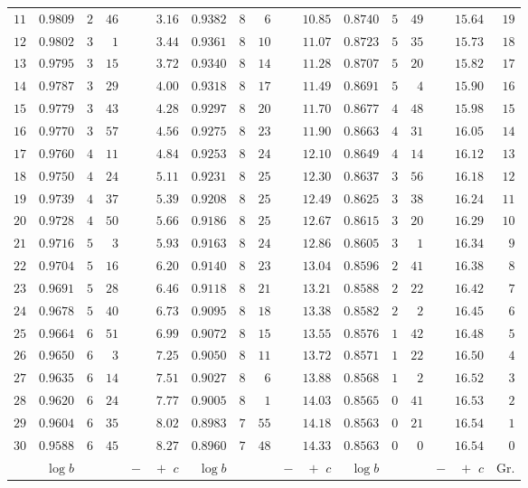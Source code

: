 \begin{center}
\begin{tabular}{r||r|rr|r||r|rr|r||r|rr|r||r}
$11$&$0.9809$&$2$&$46$&$3.16$&$0.9382$&$8$&$6$&$10.85$&$0.8740$&$5$&$49$&$15.64$&$19$\\
$12$&$0.9802$&$3$&$1$&$3.44$&$0.9361$&$8$&$10$&$11.07$&$0.8723$&$5$&$35$&$15.73$&$18$\\
$13$&$0.9795$&$3$&$15$&$3.72$&$0.9340$&$8$&$14$&$11.28$&$0.8707$&$5$&$20$&$15.82$&$17$\\
$14$&$0.9787$&$3$&$29$&$4.00$&$0.9318$&$8$&$17$&$11.49$&$0.8691$&$5$&$4$&$15.90$&$16$\\
$15$&$0.9779$&$3$&$43$&$4.28$&$0.9297$&$8$&$20$&$11.70$&$0.8677$&$4$&$48$&$15.98$&$15$\\
$16$&$0.9770$&$3$&$57$&$4.56$&$0.9275$&$8$&$23$&$11.90$&$0.8663$&$4$&$31$&$16.05$&$14$\\
$17$&$0.9760$&$4$&$11$&$4.84$&$0.9253$&$8$&$24$&$12.10$&$0.8649$&$4$&$14$&$16.12$&$13$\\
$18$&$0.9750$&$4$&$24$&$5.11$&$0.9231$&$8$&$25$&$12.30$&$0.8637$&$3$&$56$&$16.18$&$12$\\
$19$&$0.9739$&$4$&$37$&$5.39$&$0.9208$&$8$&$25$&$12.49$&$0.8625$&$3$&$38$&$16.24$&$11$\\
$20$&$0.9728$&$4$&$50$&$5.66$&$0.9186$&$8$&$25$&$12.67$&$0.8615$&$3$&$20$&$16.29$&$10$\\
$21$&$0.9716$&$5$&$3$&$5.93$&$0.9163$&$8$&$24$&$12.86$&$0.8605$&$3$&$1$&$16.34$&$9$\\
$22$&$0.9704$&$5$&$16$&$6.20$&$0.9140$&$8$&$23$&$13.04$&$0.8596$&$2$&$41$&$16.38$&$8$\\
$23$&$0.9691$&$5$&$28$&$6.46$&$0.9118$&$8$&$21$&$13.21$&$0.8588$&$2$&$22$&$16.42$&$7$\\
$24$&$0.9678$&$5$&$40$&$6.73$&$0.9095$&$8$&$18$&$13.38$&$0.8582$&$2$&$2$&$16.45$&$6$\\
$25$&$0.9664$&$6$&$51$&$6.99$&$0.9072$&$8$&$15$&$13.55$&$0.8576$&$1$&$42$&$16.48$&$5$\\
$26$&$0.9650$&$6$&$3$&$7.25$&$0.9050$&$8$&$11$&$13.72$&$0.8571$&$1$&$22$&$16.50$&$4$\\
$27$&$0.9635$&$6$&$14$&$7.51$&$0.9027$&$8$&$6$&$13.88$&$0.8568$&$1$&$2$&$16.52$&$3$\\
$28$&$0.9620$&$6$&$24$&$7.77$&$0.9005$&$8$&$1$&$14.03$&$0.8565$&$0$&$41$&$16.53$&$2$\\
$29$&$0.9604$&$6$&$35$&$8.02$&$0.8983$&$7$&$55$&$14.18$&$0.8563$&$0$&$21$&$16.54$&$1$\\
$30$&$0.9588$&$6$&$45$&$8.27$&$0.8960$&$7$&$48$&$14.33$&$0.8563$&$0$&$0$&$16.54$&$0$\\
\hline
&$\log b$&&&$\log b$&&&$\log b$&&&Gr.\\

\end{tabular}
\end{center}
